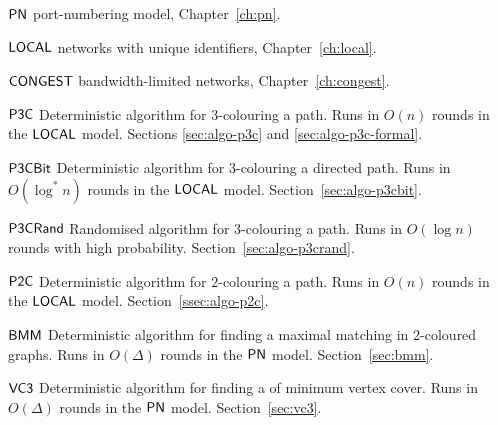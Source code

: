 
{\raggedright
\begin{notation}
    \item[$\textsf{PN}$] port-numbering model, Chapter~\ref{ch:pn}.
    \item[$\textsf{LOCAL}$] networks with unique identifiers, Chapter~\ref{ch:local}.
    \item[$\textsf{CONGEST}$] bandwidth-limited networks, Chapter~\ref{ch:congest}.
\end{notation}}


\begin{algorithms}
    \item[$\textsf{P3C}$] Deterministic algorithm for $3$-colouring a path. Runs in $O(n)$ rounds in the $\textsf{LOCAL}$ model. Sections \ref{sec:algo-p3c} and \ref{sec:algo-p3c-formal}.
    \item[$\textsf{P3CBit}$] Deterministic algorithm for $3$-colouring a directed path. Runs in $O(\log^* n)$ rounds in the $\textsf{LOCAL}$ model. Section~\ref{sec:algo-p3cbit}.
    \item[$\textsf{P3CRand}$] Randomised algorithm for $3$-colouring a path. Runs in $O(\log n)$ rounds with high probability. Section~\ref{sec:algo-p3crand}.
    \item[$\textsf{P2C}$] Deterministic algorithm for $2$-colouring a path. Runs in $O(n)$ rounds in the $\textsf{LOCAL}$ model. Section~\ref{ssec:algo-p2c}.
    \item[$\textsf{BMM}$] Deterministic algorithm for finding a maximal matching in $2$-coloured graphs. Runs in $O(\Delta)$ rounds in the $\textsf{PN}$ model. Section~\ref{sec:bmm}.
    \item[$\textsf{VC3}$] Deterministic algorithm for finding a  of minimum vertex cover. Runs in $O(\Delta)$ rounds in the $\textsf{PN}$ model. Section~\ref{sec:vc3}.
\end{algorithms}
